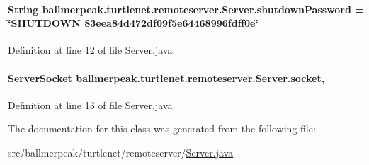 \hypertarget{classballmerpeak_1_1turtlenet_1_1remoteserver_1_1Server_a1e2e63723daf1b2544af8d00be7ba4f0}{
\paragraph[{shutdown\-Password}]{\setlength{\rightskip}{0pt plus 5cm}String ballmerpeak.\-turtlenet.\-remoteserver.\-Server.\-shutdown\-Password = \char`\"{}S\-H\-U\-T\-D\-O\-W\-N 83eea84d472df09f5e64468996fdff0e\char`\"{}\hspace{0.3cm}{\ttfamily [static]}}}\label{classballmerpeak_1_1turtlenet_1_1remoteserver_1_1Server_a1e2e63723daf1b2544af8d00be7ba4f0}


Definition at line 12 of file Server.\-java.

\hypertarget{classballmerpeak_1_1turtlenet_1_1remoteserver_1_1Server_a7c8eb04639b16695b20c36b55d3e1773}{
\paragraph[{socket}]{\setlength{\rightskip}{0pt plus 5cm}Server\-Socket ballmerpeak.\-turtlenet.\-remoteserver.\-Server.\-socket\hspace{0.3cm}{\ttfamily [static]}, {\ttfamily [private]}}}\label{classballmerpeak_1_1turtlenet_1_1remoteserver_1_1Server_a7c8eb04639b16695b20c36b55d3e1773}


Definition at line 13 of file Server.\-java.



The documentation for this class was generated from the following file\-:\begin{DoxyCompactItemize}
\item 
src/ballmerpeak/turtlenet/remoteserver/\hyperlink{Server_8java}{Server.\-java}\end{DoxyCompactItemize}
